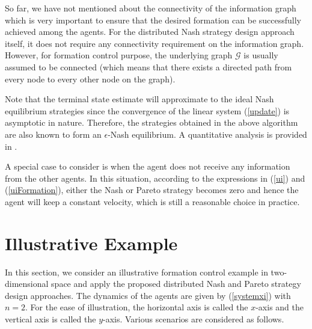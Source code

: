 \documentclass[12pt,draftcls,onecolumn]{IEEEtran}  %
\begin{document}
{\begin{Rmk}
So far, we have not mentioned about the connectivity of the information graph which is very important to ensure that the desired formation can be successfully achieved among the agents. For the distributed Nash strategy design approach itself, it does not require any connectivity requirement on the information graph. However, for formation control purpose, the underlying graph $\mathcal{G}$ is usually assumed to be connected (which means that there exists a directed path from every node to every other node on the graph).
\end{Rmk}

{Note that the terminal state estimate will approximate to the ideal Nash equilibrium strategies since the convergence of the linear system (\ref{update}) is asymptotic in nature. Therefore, the strategies obtained in the above algorithm are also known to form an $\epsilon$-Nash equilibrium. A quantitative analysis is provided in \cite{LinThesis}.}








{A special case to consider is when the agent does not receive any information from the other agents. In this situation, according to the expressions in (\ref{ui}) and (\ref{uiFormation}), either the Nash or Pareto strategy becomes zero and hence the agent will keep a constant velocity, which is still a reasonable choice in practice.}
\section{Illustrative Example}\label{simulation}
In this section, we consider an illustrative formation control example in two-dimensional space and apply the proposed distributed Nash and Pareto strategy design approaches. The dynamics of the agents are given by (\ref{systemxi}) with $n=2$. For the ease of illustration, the horizontal axis is called the $x$-axis and the vertical axis is called the $y$-axis. Various scenarios are considered as follows.

}
\end{document}
